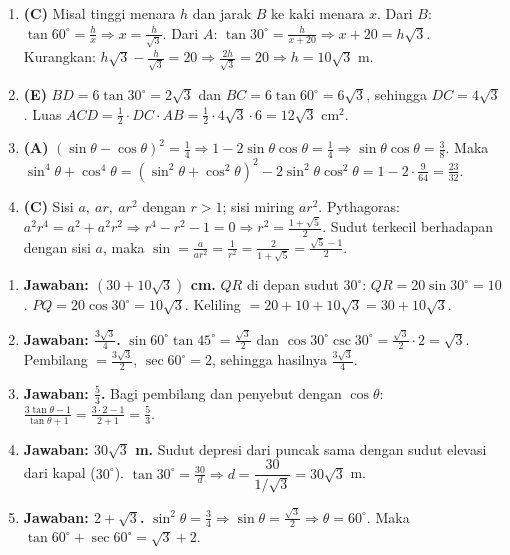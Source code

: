 \documentclass[a4paper,11pt]{article}
\newcommand{\dis}{\displaystyle}
\newcounter{no}
\begin{document}
\begin{enumerate}[leftmargin=2em,itemsep=2pt,topsep=2pt]
\item[\textbf{12.}] \textbf{(C)} Misal tinggi menara $h$ dan jarak $B$ ke kaki menara $x$. Dari $B$: $\tan60^\circ=\dis\frac hx\Rightarrow x=\dis\frac{h}{\sqrt3}$. Dari $A$: $\tan30^\circ=\dis\frac{h}{x+20}\Rightarrow x+20=h\sqrt3$. Kurangkan: $h\sqrt3-\dis\frac{h}{\sqrt3}=20\Rightarrow\dis\frac{2h}{\sqrt3}=20\Rightarrow h=10\sqrt3$ m.
\item[\textbf{13.}] \textbf{(E)} $BD=6\tan30^\circ=2\sqrt3$ dan $BC=6\tan60^\circ=6\sqrt3$, sehingga $DC=4\sqrt3$. Luas $ACD=\dis\frac12\cdot DC\cdot AB=\dis\frac12\cdot4\sqrt3\cdot6=12\sqrt3$ cm$^{2}$.
\item[\textbf{14.}] \textbf{(A)} $(\sin\theta-\cos\theta)^{2}=\dis\frac14\Rightarrow1-2\sin\theta\cos\theta=\dis\frac14\Rightarrow\sin\theta\cos\theta=\dis\frac38$. Maka $\sin^{4}\theta+\cos^{4}\theta=\left(\sin^{2}\theta+\cos^{2}\theta\right)^{2}-2\sin^{2}\theta\cos^{2}\theta=1-2\cdot\dis\frac{9}{64}=\dis\frac{23}{32}$.
\item[\textbf{15.}] \textbf{(C)} Sisi $a,\ ar,\ ar^{2}$ dengan $r>1$; sisi miring $ar^{2}$. Pythagoras: $a^{2}r^{4}=a^{2}+a^{2}r^{2}\Rightarrow r^{4}-r^{2}-1=0\Rightarrow r^{2}=\dis\frac{1+\sqrt5}{2}$. Sudut terkecil berhadapan dengan sisi $a$, maka $\sin=\dis\frac{a}{ar^{2}}=\dis\frac1{r^{2}}=\dis\frac{2}{1+\sqrt5}=\dis\frac{\sqrt5-1}{2}$.
\end{enumerate}
\par{}\par\vspace{0.2em}
\small\begin{enumerate}[leftmargin=2em,itemsep=2pt,topsep=2pt]
\item[\textbf{1.}] \textbf{Jawaban: $\left(30+10\sqrt3\right)$ cm.} $QR$ di depan sudut $30^\circ$: $QR=20\sin30^\circ=10$. $PQ=20\cos30^\circ=10\sqrt3$. Keliling $=20+10+10\sqrt3=30+10\sqrt3$.
\item[\textbf{2.}] \textbf{Jawaban: $\dis\frac{3\sqrt3}{4}$.} $\sin60^\circ\tan45^\circ=\dis\frac{\sqrt3}{2}$ dan $\cos30^\circ\csc30^\circ=\dis\frac{\sqrt3}{2}\cdot2=\sqrt3$. Pembilang $=\dis\frac{3\sqrt3}{2}$, $\sec60^\circ=2$, sehingga hasilnya $\dis\frac{3\sqrt3}{4}$.
\item[\textbf{3.}] \textbf{Jawaban: $\dis\frac53$.} Bagi pembilang dan penyebut dengan $\cos\theta$: $\dis\frac{3\tan\theta-1}{\tan\theta+1}=\dis\frac{3\cdot2-1}{2+1}=\dis\frac53$.
\item[\textbf{4.}] \textbf{Jawaban: $30\sqrt3$ m.} Sudut depresi dari puncak sama dengan sudut elevasi dari kapal ($30^\circ$). $\tan30^\circ=\dis\frac{30}{d}\Rightarrow d=\dfrac{30}{1/\sqrt3}=30\sqrt3$ m.
\item[\textbf{5.}] \textbf{Jawaban: $2+\sqrt3$.} $\sin^{2}\theta=\dis\frac34\Rightarrow\sin\theta=\dis\frac{\sqrt3}{2}\Rightarrow\theta=60^\circ$. Maka $\tan60^\circ+\sec60^\circ=\sqrt3+2$.
\end{enumerate}
\end{document}
